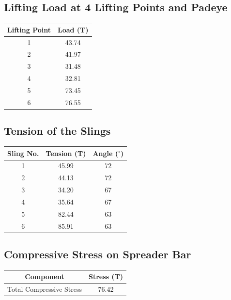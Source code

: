 \documentclass[12pt]{article}
\begin{document}
\subsection*{Lifting Load at 4 Lifting Points and Padeye}
\begin{center}
\begin{tabular}{|c|c|}
\hline
Lifting Point & Load (T) \\
\hline
1 & 43.74 \\
2 & 41.97 \\
3 & 31.48 \\
4 & 32.81 \\
5 & 73.45 \\
6 & 76.55 \\
\hline
\end{tabular}
\end{center}

\subsection*{Tension of the Slings}
\begin{center}
\begin{tabular}{|c|c|c|}
\hline
Sling No. & Tension (T) & Angle ($^\circ$) \\
\hline
1 & 45.99 & 72 \\
2 & 44.13 & 72 \\
3 & 34.20 & 67 \\
4 & 35.64 & 67 \\
5 & 82.44 & 63 \\
6 & 85.91 & 63 \\
\hline
\end{tabular}
\end{center}

\subsection*{Compressive Stress on Spreader Bar}
\begin{center}
\begin{tabular}{|c|c|}
\hline
Component & Stress (T) \\
\hline
Total Compressive Stress & 76.42 \\
\hline
\end{tabular}
\end{center}
\end{document}
